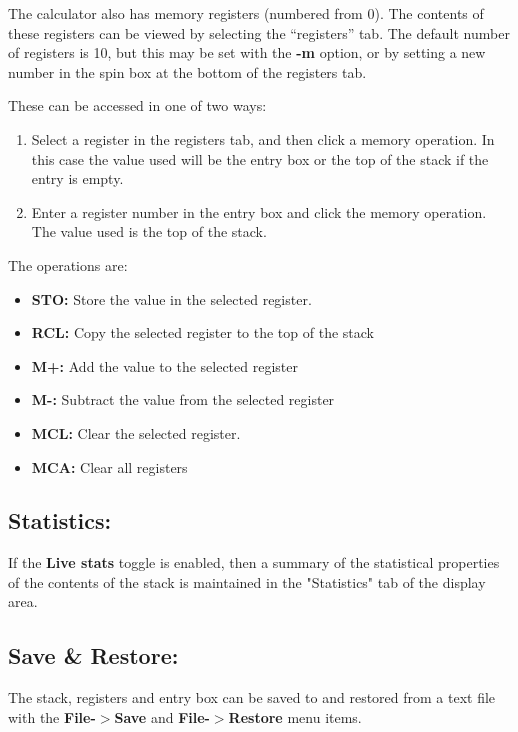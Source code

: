\documentclass{article}
\begin{document}
  The calculator also has memory registers (numbered from 0). The
  contents of these registers can be viewed by selecting the
  ``registers'' tab. The default number of registers is 10, but this
  may be set with the \textbf{-m} option, or by setting a new number in
  the spin box at the bottom of the registers tab.

  These can be accessed in one of two ways:
  \begin{enumerate}
  \item Select a register in the registers tab, and then click a memory
    operation. In this case the value used will be the entry box or the
    top of the stack if the entry is empty.
  \item Enter a register number in the entry box and click the memory
    operation. The value used is the top of the stack.
  \end{enumerate}

  The operations are:
  \begin{itemize}
  \item \textbf{STO:} Store the value in the selected register.
  \item \textbf{RCL:} Copy the selected register to the top of the
    stack
  \item \textbf{M+:} Add the value to the selected register
  \item \textbf{M-:} Subtract the value from the selected register
  \item \textbf{MCL:} Clear the selected register.
  \item \textbf{MCA:} Clear all registers

  \end{itemize}

  \subsection{Statistics:}

  If the \textbf{Live stats} toggle is enabled, then a summary of the
  statistical properties of the contents of the stack is maintained in
  the "Statistics" tab of the display area. 

  \subsection{Save \& Restore:}

  The stack, registers and entry box can be saved to and restored from
  a text file with the \textbf{File-$>$Save} and
  \textbf{File-$>$Restore} menu items.
\end{document}
